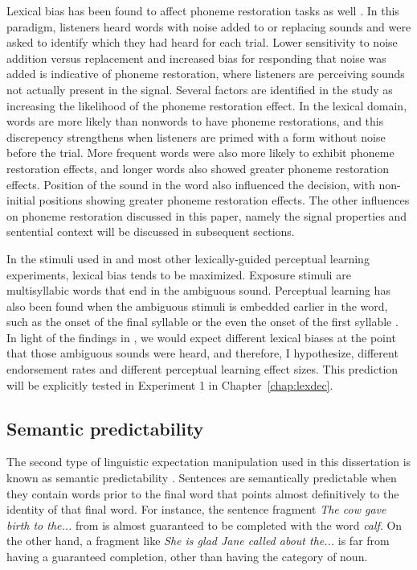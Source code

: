 Lexical bias has been found to affect phoneme restoration tasks as well \citep{Samuel1981}.  
In this paradigm, listeners heard words with noise added to or replacing sounds and were asked to identify which they had heard for each trial.  
Lower sensitivity to noise addition versus replacement and increased bias for responding that noise was added is indicative of phoneme restoration, where listeners are perceiving sounds not actually present in the signal.  
Several factors are identified in the study as increasing the likelihood of the phoneme restoration effect.
In the lexical domain, words are more likely than nonwords to have phoneme restorations, and this discrepency strengthens when listeners are primed with a form without noise before the trial.  
More frequent words were also more likely to exhibit phoneme restoration effects, and longer words also showed greater phoneme restoration effects.  
Position of the sound in the word also influenced the decision, with non-initial positions showing greater phoneme restoration effects. 
 The other influences on phoneme restoration discussed in this paper, namely the signal properties and sentential context will be discussed in subsequent sections.

In the stimuli used in \citet{Norris2003} and most other lexically-guided perceptual learning experiments, lexical bias tends to be maximized.  Exposure stimuli are multisyllabic words that end in the ambiguous sound.  Perceptual learning has also been found when the ambiguous stimuli is embedded earlier in the word, such as the onset of the final syllable \citep{Kraljic2005, Kraljic2008, Kraljic2008a} or the even the onset of the first syllable \citep{Clare2014}.  In light of the findings in \citet{Pitt2012}, we would expect different lexical biases at the point that those ambiguous sounds were heard, and therefore, I hypothesize, different endorsement rates and different perceptual learning effect sizes.  This prediction will be explicitly tested in Experiment 1 in Chapter~\ref{chap:lexdec}.

\subsection{Semantic predictability}
\label{sec:semanticpredictability}

The second type of linguistic expectation manipulation used in this dissertation is known as semantic predictability \citep{Kalikow1977}.
Sentences are semantically predictable when they contain words prior to the final word that points almost definitively to the identity of that final word.  
For instance, the sentence fragment \emph{The cow gave birth to the...} from \citet{Kalikow1977} is almost guaranteed to be completed with the word \emph{calf}.  
On the other hand, a fragment like \emph{She is glad Jane called about the...} is far from having a guaranteed completion, other than having the category of noun.

